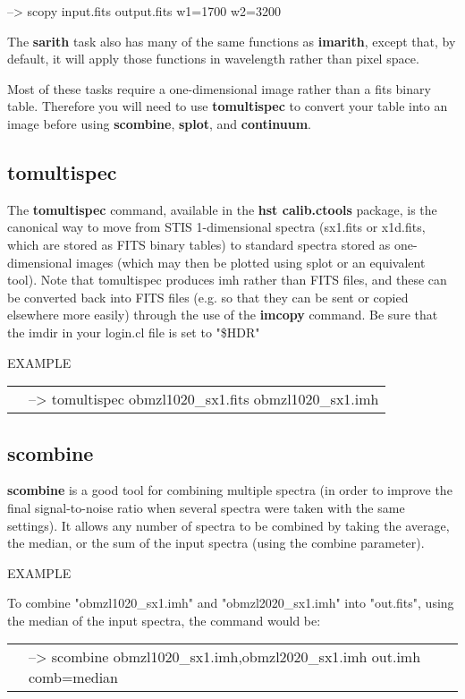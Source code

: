 {\color{RoyalBlue} --> scopy input.fits output.fits w1=1700 w2=3200}

The {\bf sarith} task also has many of the same functions as {\bf imarith}, except that, by default, it will apply those functions in wavelength rather than pixel space.

Most of these tasks require a one-dimensional image rather than a fits binary table. Therefore you will need to use {\bf tomultispec} to convert your table into an image before using {\bf scombine}, {\bf splot},  and {\bf continuum}.

\subsection{{\bf tomultispec}}
The {\bf tomultispec} command, available in the {\bf hst calib.ctools} package, is the canonical way to move from STIS 1-dimensional spectra (sx1.fits or x1d.fits, which are stored as FITS binary tables) to standard spectra stored as one-dimensional images (which may then be plotted using splot or an equivalent tool). Note that tomultispec produces imh rather than FITS files, and these can be converted back into FITS files (e.g. so that they can be sent or copied elsewhere more easily) through the use of the {\bf imcopy} command. Be sure that the imdir in your login.cl file is set to "\$HDR"

EXAMPLE

\begin{tabular}{ll}
& {\color{RoyalBlue}--> tomultispec obmzl1020\_sx1.fits obmzl1020\_sx1.imh}
\end{tabular}

\subsection{{\bf scombine}}
{\bf scombine} is a good tool for combining multiple spectra (in order to improve the final signal-to-noise ratio when several spectra were taken with the same settings). It allows any number of spectra to be combined by taking the average, the median, or the sum of the input spectra (using the combine parameter). 

EXAMPLE

To combine "obmzl1020\_sx1.imh" and "obmzl2020\_sx1.imh" into "out.fits", using the median of the input spectra, the command would be:

\begin{tabular}{ll}
& {\color{RoyalBlue} --> scombine obmzl1020\_sx1.imh,obmzl2020\_sx1.imh out.imh comb=median}
\end{tabular}

